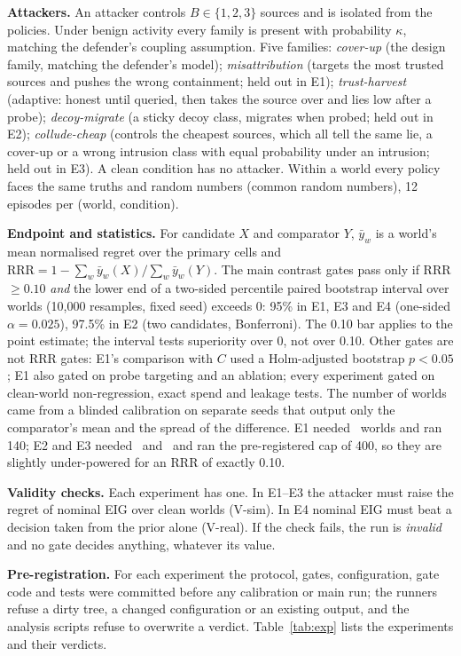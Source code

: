 \documentclass[conference]{IEEEtran}
\begin{document}
\textbf{Attackers.} An attacker controls $B\in\{1,2,3\}$ sources and is isolated from the policies. Under benign
activity every family is present with probability $\kappa$, matching the defender's coupling assumption. Five families:
\emph{cover-up} (the design family, matching the defender's model); \emph{misattribution} (targets the most trusted
sources and pushes the wrong containment; held out in E1); \emph{trust-harvest} (adaptive: honest until queried, then
takes the source over and lies low after a probe); \emph{decoy-migrate} (a sticky decoy class, migrates when probed;
held out in E2); \emph{collude-cheap} (controls the cheapest sources, which all tell the same lie, a cover-up or a wrong
intrusion class with equal probability under an intrusion; held out in E3). A clean condition has no attacker. Within
a world every policy faces the same truths and random numbers (common random numbers), 12 episodes per (world,
condition).

\textbf{Endpoint and statistics.} For candidate $X$ and comparator $Y$, $\bar y_w$ is a world's mean normalised regret
over the primary cells and $\text{RRR}=1-\sum_w\bar y_w(X)/\sum_w\bar y_w(Y)$. The main contrast gates pass only if
RRR $\ge 0.10$ \emph{and} the lower end of a two-sided percentile paired bootstrap interval over worlds (10{,}000
resamples, fixed seed) exceeds 0: 95\% in E1, E3 and E4 (one-sided $\alpha=0.025$), 97.5\% in E2 (two candidates,
Bonferroni). The 0.10 bar applies to the point estimate; the interval tests superiority over 0, not over 0.10. Other
gates are not RRR gates: E1's comparison with $C$ used a Holm-adjusted bootstrap $p<0.05$; E1 also gated on probe
targeting and an ablation; every experiment gated on clean-world non-regression, exact spend and leakage tests. The
number of worlds came from a blinded calibration on separate seeds that output only the comparator's mean and the
spread of the difference. E1 needed \numcalibL\ worlds and ran 140; E2 and E3 needed \numcalibT\ and \numcalibU\ and
ran the pre-registered cap of 400, so they are slightly under-powered for an RRR of exactly 0.10.

\textbf{Validity checks.} Each experiment has one. In E1--E3 the attacker must raise the regret of nominal EIG over
clean worlds (V-sim). In E4 nominal EIG must beat a decision taken from the prior alone (V-real). If the check fails,
the run is \emph{invalid} and no gate decides anything, whatever its value.

\textbf{Pre-registration.} For each experiment the protocol, gates, configuration, gate code and tests were committed
before any calibration or main run; the runners refuse a dirty tree, a changed configuration or an existing output, and
the analysis scripts refuse to overwrite a verdict. Table~\ref{tab:exp} lists the experiments and their verdicts.
\end{document}
